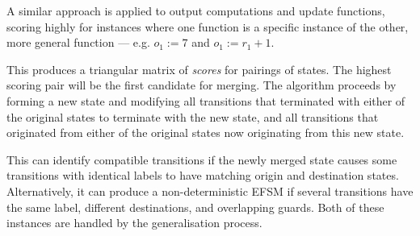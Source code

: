 A similar approach is applied to output computations and update functions, scoring highly for instances where one function is a specific instance of the other, more general function --- e.g. $o_1 := 7$ and $o_1 := r_1 + 1$.

This produces a triangular matrix of \emph{scores} for pairings of states. The highest scoring pair will be the first candidate for merging. The algorithm proceeds by forming a new state and modifying all transitions that terminated with either of the original states to terminate with the new state, and all transitions that originated from either of the original states now originating from this new state.

This can identify compatible transitions if the newly merged state causes some transitions with identical labels to have matching origin and destination states. Alternatively, it can produce a non-deterministic EFSM if several transitions have the same label, different destinations, and overlapping guards. Both of these instances are handled by the generalisation process.


